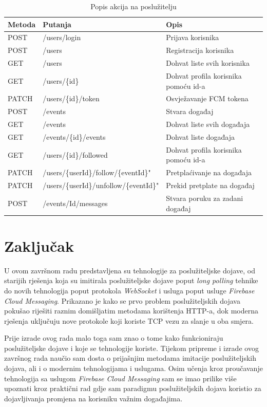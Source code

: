 \documentclass[times, utf8, zavrsni]{fer}
\begin{document}
{\begin{table}[htb]
\caption{Popis akcija na poslužitelju}
\label{tbl:endpoints}
\centering
\begin{tabular}{lll} \hline
Metoda & Putanja & Opis\\ \hline
POST & /users/login & Prijava korisnika\\
POST & /users & Registracija korisnika\\
GET & /users & Dohvat liste svih korisnika\\
GET & /users/\{id\} & Dohvat profila korisnika pomoću id-a\\
PATCH & /users/\{id\}/token & Osvježavanje FCM tokena\\
POST & /events & Stvara događaj\\
GET & /events & Dohvat liste svih događaja\\
GET & /events/\{id\}/events & Dohvat liste događaja\\
GET & /users/\{id\}/followed & Dohvat profila korisnika pomoću id-a\\
PATCH & /users/\{userId\}/follow/\{eventId\}" & Pretplaćivanje na događaja\\
PATCH & /users/\{userId\}/unfollow/\{eventId\}" & Prekid pretplate na događaj\\
POST & /events/{Id}/messages & Stvara poruku za zadani događaj\\ \hline
\end{tabular}
\end{table}

\chapter{Zaključak}

U ovom završnom radu predstavljena su tehnologije za poslužiteljske dojave, od starijih rješenja koja su imitirala poslužiteljske dojave poput {\em long polling} tehnike do novih tehnologija poput protokola {\em WebSocket} i usluga poput usluge {\em Firebase Cloud Messaging}. Prikazano je kako se prvo problem poslužiteljskih dojava pokušao riješiti raznim domišljatim metodama korištenja HTTP-a, dok moderna rješenja uključuju nove protokole koji koriste TCP vezu za slanje u oba smjera.

Prije izrade ovog rada malo toga sam znao o tome kako funkcioniraju poslužiteljske dojave i koje se tehnologije koriste. Tijekom pripreme i izrade ovog završnog rada naučio sam dosta o prijašnjim metodama imitacije poslužiteljskih dojava, ali i o modernim tehnologijama i uslugama. Osim učenja kroz proučavanje tehnologija sa uslugom {\em Firebase Cloud Messaging} sam se imao prilike više upoznati kroz praktični rad gdje sam paradigmu poslužiteljskih dojava koristio za dojavljivanja promjena na korisniku važnim događajima.

}
\end{document}
